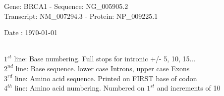 \documentclass{article}
\begin{document}
\renewcommand{\footrulewidth}{1pt}
\renewcommand{\headrulewidth}{0pt}
\begin{center}
\begin{large}
Gene: BRCA1 - Sequence: NG\_005905.2\\
Transcript: NM\_007294.3 - Protein: NP\_009225.1
 
 Date : \today\\\\
\end{large}
\end{center}
$1^{st}$ line: Base numbering. Full stops for intronic +/- 5, 10, 15...\\
$2^{nd}$ line: Base sequence. lower case Introns, upper case Exons\\
$3^{rd}$ line: Amino acid sequence. Printed on FIRST base of codon\\
$4^{th}$ line: Amino acid numbering. Numbered on $1^{st}$ and increments of 10\\
\end{document}

